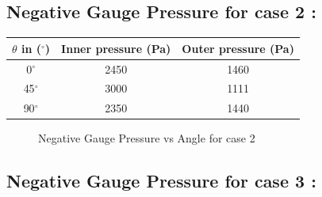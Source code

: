 \documentclass[12pt,a4paper]{article}
\begin{document}
\subsection{Negative Gauge Pressure for case 2 :}

\begin{center}
\begin{tabular}{ |c|c|c| } 
 \hline
 \textbf{$\theta$ in ($^{\circ}$)} & \textbf{Inner pressure (Pa)} & \textbf{Outer pressure (Pa)} \\ 
 \hline
0$^{\circ}$ & 2450 & 1460 \\ 
 \hline
 45$^{\circ}$ & 3000 & 1111 \\ 
 \hline
90$^{\circ}$ & 2350 & 1440 \\ 
 \hline
\end{tabular}
\end{center}
\begin{figure}[!ht]
	\begin{center}
	\end{center}
	\caption{Negative Gauge Pressure vs Angle for case 2}
\end{figure}
\subsection{Negative Gauge Pressure for case 3 :}
\end{document}
